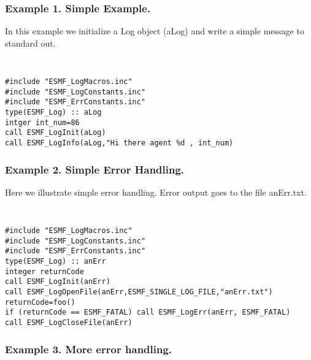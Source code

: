 %




\subsubsection{Example 1. Simple Example.}

In this example we initialize a Log object (aLog) and write a simple message
to standard out.

{\tt
\begin{verbatim}
#include "ESMF_LogMacros.inc"
#include "ESMF_LogConstants.inc"
#include "ESMF_ErrConstants.inc"
type(ESMF_Log) :: aLog
intger int_num=86
call ESMF_LogInit(aLog)
call ESMF_LogInfo(aLog,"Hi there agent %d , int_num)
\end{verbatim}
}\tt

\subsubsection{Example 2. Simple Error Handling.}

Here we illustrate simple error handling.  Error output goes to the
file anErr.txt.

{\tt
\begin{verbatim}
#include "ESMF_LogMacros.inc"
#include "ESMF_LogConstants.inc"
#include "ESMF_ErrConstants.inc"
type(ESMF_Log) :: anErr
integer returnCode 
call ESMF_LogInit(anErr)
call ESMF_LogOpenFile(anErr,ESMF_SINGLE_LOG_FILE,"anErr.txt")
returnCode=foo()
if (returnCode == ESMF_FATAL) call ESMF_LogErr(anErr, ESMF_FATAL) 
call ESMF_LogCloseFile(anErr)
\end{verbatim}
}\tt

\subsubsection{Example 3. More error handling.}


